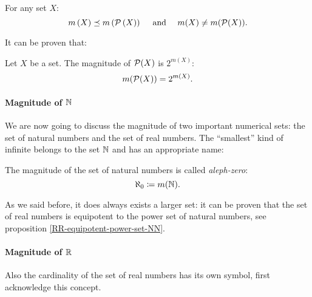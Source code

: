 \begin{theo}[Cantor]
	For any set $X$:
	$$m\left(X\right) \preceq m\left(\mathcal P\left(X\right)\right)\quad \text{ and }\quad m(X) \neq m(\mathcal P(X)).$$
\end{theo}


It can be proven that:
\begin{prop} \label{magnitude-of-power-set}
	Let $X$ be a set. The magnitude of $\mathcal P(X)$ is $2^{m(X)}$:
	$$m(\mathcal P(X)) = 2^{m(X)}.$$
\end{prop}

\paragraph{Magnitude of $\mathbb N$} We are now going to discuss the magnitude of two important numerical sets: the set of natural numbers and the set of real numbers. The ``smallest'' kind of infinite belongs to the set $\mathbb N$ and has an appropriate name:
\begin{defn} 
	The magnitude of the set of natural numbers is called \emph{aleph-zero}:
	$$\aleph_0 \coloneqq m(\mathbb N).$$ \label{continuum}
\end{defn}

As we said before, it does always exists a larger set: it can be proven that the set of real numbers is equipotent to the power set of natural numbers, see proposition \vref{RR-equipotent-power-set-NN}. 

\paragraph{Magnitude of $\mathbb R$} Also the cardinality of the set of real numbers has its own symbol, first acknowledge this concept.

